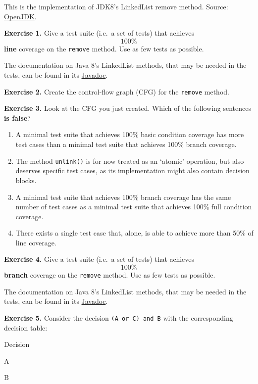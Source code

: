 This is the implementation of JDK8's LinkedList remove method. Source:
\href{http://hg.openjdk.java.net/jdk8/jdk8/jdk/file/687fd7c7986d/src/share/classes/java/util/LinkedList.java}{OpenJDK}.

\textbf{Exercise 1.} Give a test suite (i.e.~a set of tests) that
achieves \[100\%\] \textbf{line} coverage on the \texttt{remove} method.
Use as few tests as possible.

The documentation on Java 8's LinkedList methods, that may be needed in
the tests, can be found in its
\href{https://devdocs.io/openjdk~8/java/util/linkedlist}{Javadoc}.

\textbf{Exercise 2.} Create the control-flow graph (CFG) for the
\texttt{remove} method.

\textbf{Exercise 3.} Look at the CFG you just created. Which of the
following sentences \textbf{is false}?

\begin{enumerate}
\def\labelenumi{\arabic{enumi}.}
\item
  A minimal test suite that achieves 100\% basic condition coverage has
  more test cases than a minimal test suite that achieves 100\% branch
  coverage.
\item
  The method \texttt{unlink()} is for now treated as an `atomic'
  operation, but also deserves specific test cases, as its
  implementation might also contain decision blocks.
\item
  A minimal test suite that achieves 100\% branch coverage has the same
  number of test cases as a minimal test suite that achieves 100\% full
  condition coverage.
\item
  There exists a single test case that, alone, is able to achieve more
  than 50\% of line coverage.
\end{enumerate}

\textbf{Exercise 4.} Give a test suite (i.e.~a set of tests) that
achieves \[100\%\] \textbf{branch} coverage on the \texttt{remove}
method. Use as few tests as possible.

The documentation on Java 8's LinkedList methods, that may be needed in
the tests, can be found in its
\href{https://devdocs.io/openjdk~8/java/util/linkedlist}{Javadoc}.

\textbf{Exercise 5.} Consider the decision \texttt{(A\ or\ C)\ and\ B}
with the corresponding decision table:

Decision

A

B

